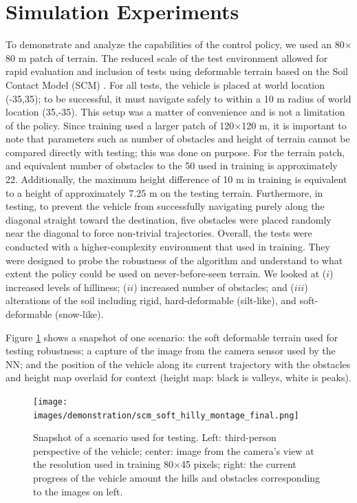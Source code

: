 \section{Simulation Experiments}
\label{sec:demoTechnology}
To demonstrate and analyze the capabilities of the control policy, we used an 80$ \times $80 m patch of terrain. The reduced scale of the test environment allowed for rapid evaluation and inclusion of tests using deformable terrain based on the Soil Contact Model (SCM) \cite{ChronoSCM2019}. For all tests, the vehicle is placed at world location (-35,35); to be successful, it must navigate safely to within a 10 m radius of world location (35,-35). This setup was a matter of convenience and is not a limitation of the policy. Since training used a larger patch of 120$ \times $120 m, it is important to note that parameters such as number of obstacles and height of terrain cannot be compared directly with testing; this was done on purpose. For the terrain patch, and equivalent number of obstacles to the 50 used in training is approximately 22. Additionally, the maximum height difference of 10 m in training is equivalent to a height of approximately 7.25 m on the testing terrain. Furthermore, in testing, to prevent the vehicle from successfully navigating purely along the diagonal straight toward the destination, five obstacles were placed randomly near the diagonal to force non-trivial trajectories. Overall, the tests were conducted with a higher-complexity environment that used in training. They were designed to probe the robustness of the algorithm and understand to what extent the policy could be used on never-before-seen terrain. We looked at ($i$) increased levels of hilliness; ($ii$) increased number of obstacles; and ($iii$) alterations of the soil including rigid, hard-deformable (silt-like), and soft-deformable (snow-like). 

Figure \ref{fig:scm_soft_hilly_deformed} shows a snapshot of one scenario: the soft deformable terrain used for testing robustness; a capture of the image from the camera sensor used by the NN; and the position of the vehicle along its current trajectory with the obstacles and height map overlaid for context (height map: black is valleys, white is peaks). 

\begin{figure}[h]
    \centering
    \texttt{[image: images/demonstration/scm\_soft\_hilly\_montage\_final.png]}
    \caption{Snapshot of a scenario used for testing. Left: third-person perspective of the vehicle; center: image from the camera's view at the resolution used in training 80$ \times $45 pixels; right: the current progress of the vehicle amount the hills and obstacles corresponding to the images on left. }
    \label{fig:scm_soft_hilly_deformed}
\end{figure}

